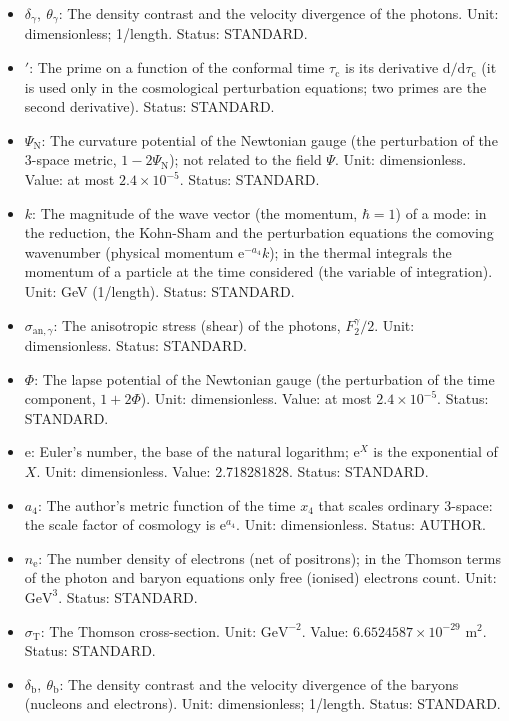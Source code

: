 \documentclass[
  10pt,
]{article}
\providecommand{\tightlist}{%
  \setlength{\itemsep}{0pt}\setlength{\parskip}{0pt}}
\begin{document}
\begin{itemize}
\tightlist
\item
  \(\delta_\gamma,\ \theta_\gamma\): The density contrast and the
  velocity divergence of the photons. Unit: dimensionless; 1/length.
  Status: STANDARD.
\item
  \({}'\): The prime on a function of the conformal time
  \(\tau_{\mathrm{c}}\) is its derivative
  \(\mathrm{d}/\mathrm{d}\tau_{\mathrm{c}}\) (it is used only in the
  cosmological perturbation equations; two primes are the second
  derivative). Status: STANDARD.
\item
  \(\Psi_{\mathrm{N}}\): The curvature potential of the Newtonian gauge
  (the perturbation of the 3-space metric, \(1 - 2\Psi_{\mathrm{N}}\));
  not related to the field \(\Psi\). Unit: dimensionless. Value: at most
  \(2.4\times10^{-5}\). Status: STANDARD.
\item
  \(k\): The magnitude of the wave vector (the momentum, \(\hbar = 1\))
  of a mode: in the reduction, the Kohn-Sham and the perturbation
  equations the comoving wavenumber (physical momentum
  \(\mathrm{e}^{-a_4}k\)); in the thermal integrals the momentum of a
  particle at the time considered (the variable of integration). Unit:
  GeV (1/length). Status: STANDARD.
\item
  \(\sigma_{\mathrm{an},\gamma}\): The anisotropic stress (shear) of the
  photons, \(F^\gamma_2/2\). Unit: dimensionless. Status: STANDARD.
\item
  \(\Phi\): The lapse potential of the Newtonian gauge (the perturbation
  of the time component, \(1 + 2\Phi\)). Unit: dimensionless. Value: at
  most \(2.4\times10^{-5}\). Status: STANDARD.
\item
  \(\mathrm{e}\): Euler's number, the base of the natural logarithm;
  \(\mathrm{e}^{X}\) is the exponential of \(X\). Unit: dimensionless.
  Value: 2.718281828. Status: STANDARD.
\item
  \(a_4\): The author's metric function of the time \(x_4\) that scales
  ordinary 3-space: the scale factor of cosmology is
  \(\mathrm{e}^{a_4}\). Unit: dimensionless. Status: AUTHOR.
\item
  \(n_{\mathrm{e}}\): The number density of electrons (net of
  positrons); in the Thomson terms of the photon and baryon equations
  only free (ionised) electrons count. Unit: \(\mathrm{GeV}^{3}\).
  Status: STANDARD.
\item
  \(\sigma_{\mathrm{T}}\): The Thomson cross-section. Unit:
  \(\mathrm{GeV}^{-2}\). Value: \(6.6524587\times10^{-29}\) m\(^2\).
  Status: STANDARD.
\item
  \(\delta_{\mathrm{b}},\ \theta_{\mathrm{b}}\): The density contrast
  and the velocity divergence of the baryons (nucleons and electrons).
  Unit: dimensionless; 1/length. Status: STANDARD.
\end{itemize}
\end{document}
